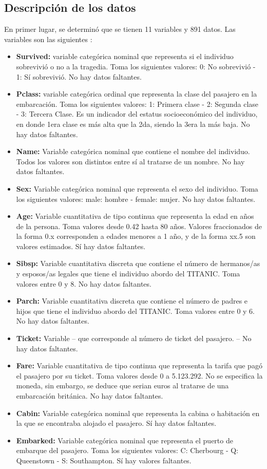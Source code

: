 \documentclass[letter, 10pt]{article}
\begin{document}
\subsection{Descripción de los datos}

En primer lugar, se determinó que se tienen 11 variables y 891 datos. Las variables son las siguientes \cite{W1}:

\begin{itemize}
\item \textbf{Survived:} variable categórica nominal que representa si el individuo sobrevivió o no a la tragedia. Toma los siguientes valores: 0: No sobrevivió - 1: Sí sobrevivió. No hay datos faltantes.
\item \textbf{Pclass:} variable categórica ordinal que representa la clase del pasajero en la embarcación. Toma los siguientes valores: 1: Primera clase - 2: Segunda clase - 3: Tercera Clase. Es un indicador del estatus socioeconómico del individuo, en donde 1era clase es más alta que la 2da, siendo la 3era la más baja. No hay datos faltantes.
\item\textbf{Name:} Variable categórica nominal que contiene el nombre del individuo. Todos los valores son distintos entre sí al tratarse de un nombre. No hay datos faltantes.
\item \textbf{Sex:} Variable categórica nominal que representa el sexo del individuo. Toma los siguientes valores: male: hombre - female: mujer. No hay datos faltantes.
\item \textbf{Age:} Variable cuantitativa de tipo continua que representa la edad en años de la persona. Toma valores desde 0.42 hasta 80 años. Valores fraccionados de la forma 0.x corresponden a edades menores a 1 año, y de la forma xx.5 son valores estimados. Sí hay datos faltantes.
\item \textbf{Sibsp:} Variable cuantitativa discreta que contiene el número de hermanos/as y esposos/as legales que tiene el individuo abordo del TITANIC. Toma valores entre 0 y 8. No hay datos faltantes.
\item \textbf{Parch:} Variable cuantitativa discreta que contiene el número de padres e hijos que tiene el individuo abordo del TITANIC. Toma valores entre 0 y 6. No hay datos faltantes.
\item \textbf{Ticket:} Variable -- que corresponde al número de ticket del pasajero. -- No hay datos faltantes.
\item \textbf{Fare:} Variable cuantitativa de tipo continua que representa la tarifa que pagó el pasajero por su ticket. Toma valores desde 0 a 5.123.292. No se especifica la moneda, sin embargo, se deduce que serian euros al tratarse de una embarcación británica. No hay datos faltantes.
\item \textbf{Cabin:} Variable categórica nominal que representa la cabina o habitación en la que se encontraba alojado el pasajero. Sí hay datos faltantes.
\item \textbf{Embarked:} Variable categórica nominal que representa el puerto de embarque del pasajero. Toma los siguientes valores: C: Cherbourg - Q: Queenstown - S: Southampton. Sí hay valores faltantes.
\end{itemize}
\end{document}
